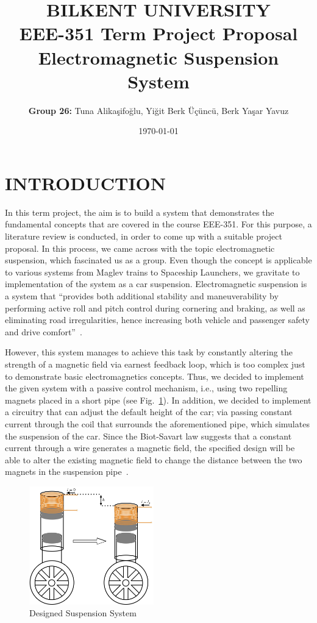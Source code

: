 \documentclass[a4paper, 10pt, conference]{IEEEtran}
\title{BILKENT UNIVERSITY \\ EEE-351 Term Project Proposal \\ Electromagnetic Suspension System}
\author{\textbf{Group 26:} Tuna Alikaşifoğlu, Yiğit Berk Üçüncü, Berk Yaşar Yavuz}
\date{\today}
\begin{document}
\maketitle

\section{INTRODUCTION}
In this term project, the aim is to build a system that demonstrates the fundamental concepts that are covered in the course EEE-351. For this purpose, a literature review is conducted, in order to come up with a suitable project proposal. In this process, we came across with the topic electromagnetic suspension, which fascinated us as a group. Even though the concept is applicable to various systems from Maglev trains to Spaceship Launchers, we gravitate to implementation of the system as a car suspension. Electromagnetic suspension is a system that ``provides both additional stability and maneuverability by performing active roll and pitch control during cornering and braking, as well as eliminating road irregularities, hence increasing both vehicle and passenger safety and drive comfort''~\autocite{active_suspension}.

However, this system manages to achieve this task by constantly altering the strength of a magnetic field via earnest feedback loop, which is too complex just to demonstrate basic electromagnetics concepts. Thus, we decided to implement the given system with a passive control mechanism, i.e., using two repelling magnets placed in a short pipe (see Fig.~\ref{fig:suspension}). In addition, we decided to implement a circuitry that can adjust the default height of the car; via passing constant current through the coil that surrounds the aforementioned pipe, which simulates the suspension of the car. Since the Biot-Savart law suggests that a constant current through a wire generates a magnetic field, the specified design will be able to alter the existing magnetic field to change the distance between the two magnets in the suspension pipe~\autocite{emt_textbook}.
\begin{figure}[ht]
    \centering
    \includegraphics[width=0.48\textwidth, height=0.25\textheight, keepaspectratio]{suspension.jpeg}
    \caption{Designed Suspension System}\label{fig:suspension}
\end{figure}
\end{document}
